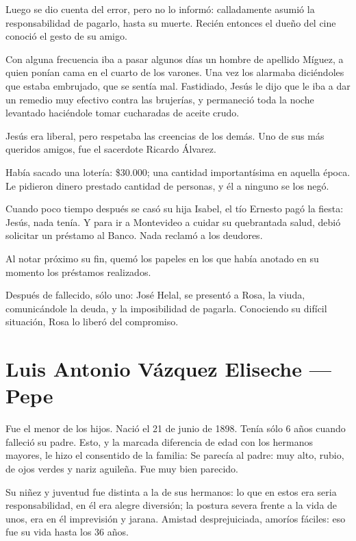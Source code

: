 \documentclass[a4paper]{article}
\begin{document}
Luego se dio cuenta del error, pero no lo informó: calladamente asumió la responsabilidad de pagarlo, hasta su muerte. Recién entonces el dueño del cine conoció el gesto de su amigo.

Con alguna frecuencia iba a pasar algunos días un hombre de apellido Mí\-guez, a quien ponían cama en el cuarto de los varones. Una vez los alarmaba di\-cién\-do\-les que estaba embrujado, que se sentía mal. Fastidiado, Jesús le dijo que le iba a dar un remedio muy efectivo contra las brujerías, y permaneció toda la noche levantado haciéndole tomar cucharadas de aceite crudo.

\bigbreak{} 

Jesús era liberal, pero respetaba las creencias de los demás. Uno de sus más queridos amigos, fue el sacerdote Ricardo Álvarez.

\bigbreak{}

Había sacado una lotería: \$30.000; una cantidad importantísima en aquella época. Le pidieron dinero prestado cantidad de personas, y él a ninguno se los negó.

Cuando poco tiempo después se casó su hija Isabel, el tío Ernesto pagó la fiesta: Jesús, nada tenía. Y para ir a Montevideo a cuidar su quebrantada salud, debió solicitar un préstamo al Banco. Nada reclamó a los deudores.

Al notar próximo su fin, quemó los papeles en los que había anotado en su momento los préstamos realizados.

Después de fallecido, sólo uno: José Helal, se presentó a Rosa, la viuda, comunicándole la deuda, y la imposibilidad de pagarla. Conociendo su difícil situación, Rosa lo liberó del compromiso.


\section{Luis Antonio Vázquez Eliseche --- Pepe}

Fue el menor de los hijos. Nació el 21 de junio de 1898. Tenía sólo 6 años cuando falleció su padre. Esto, y la marcada diferencia de edad con los hermanos mayores, le hizo el consentido de la familia: Se parecía al padre: muy alto, rubio, de ojos verdes y nariz aguileña. Fue muy bien parecido.

Su niñez y juventud fue distinta a la de sus hermanos: lo que en estos era seria responsabilidad, en él era alegre diversión; la postura severa frente a la vida de unos, era en él imprevisión y jarana. Amistad desprejuiciada, amoríos fáciles: eso fue su vida hasta los 36 años.
\end{document}
